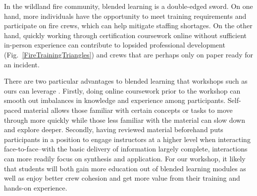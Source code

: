 \documentclass[fire,article,submit,moreauthors,pdftex]{Definitions/mdpi}
\begin{document}
In the wildland fire community, blended learning is a double-edged sword.
On one hand, more individuals have the opportunity to meet training requirements and participate on fire crews, which can help mitigate staffing shortages.
On the other hand, quickly working through certification coursework online without sufficient in-person experience can contribute to lopsided professional development (Fig.~\ref{FireTrainingTriangles}) and crews that are perhaps only on paper ready for an incident.

There are two particular advantages to blended learning that workshops such as ours can leverage \citep{cantrell2014}.
Firstly, doing online coursework prior to the workshop can smooth out imbalances in knowledge and experience among participants.
Self-paced material allows those familiar with certain concepts or tasks to move through more quickly while those less familiar with the material can slow down and explore deeper. Secondly, having reviewed material beforehand puts participants in a position to engage instructors at a higher level when interacting face-to-face--with the basic delivery of information largely complete, interactions can more readily focus on synthesis and application.
For our workshop, it likely that students will both gain more education out of blended learning modules as well as enjoy better crew cohesion and get more value from their training and hands-on experience.

\vspace{6pt}




\end{document}
